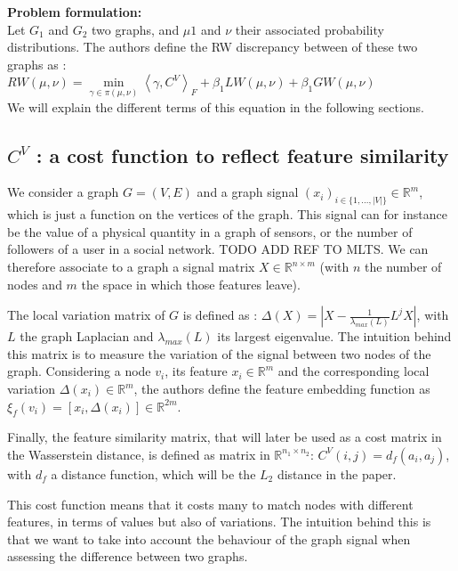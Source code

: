 \documentclass[a4paper,11pt]{article}
\begin{document}
\textbf{Problem formulation:} \\
Let $G_1$ and $G_2$ two graphs, and $\mu1$ and $\nu$ their associated probability distributions.
The authors define the RW discrepancy between of these two graphs as : \\

$RW(\mu, \nu) = \underset{\gamma \in \pi(\mu, \nu)}{\operatorname{min}} {\left\langle \gamma , C^V \right\rangle}_F   + \beta_1 LW(\mu, \nu)  +\beta_1 GW(\mu, \nu) $\\

We will explain the different terms of this equation in the following sections.

\subsection{$C^V$ : a cost function to reflect feature similarity}
\label{CV}
We consider a graph $G=(V, E)$ and a graph signal $(x_i)_{i \in \{1, ..., |V| \} } \in \mathbb{R}^m$, which is just a function on the vertices of the graph. 
This signal can for instance be the value of a physical quantity in a graph of sensors, or the number of followers of a user in a social network.
TODO ADD REF TO MLTS. 
We can therefore associate to a graph a signal matrix $X \in \mathbb{R}^{n \times m}$ (with $n$ the number of nodes and $m$ the space in which those features leave).

The local variation matrix of $G$ is defined as : $\Delta(X) = | X - \frac{1}{\lambda_{max}(L)} L^j X  |$, with $L$ the graph Laplacian and $\lambda_{max}(L)$ its largest eigenvalue.
The intuition behind this matrix is to measure the variation of the signal between two nodes of the graph.
Considering a node $v_i$, its feature $x_i \in \mathbb{R}^m$ and the corresponding local variation $\Delta(x_i) \in \mathbb{R}^m$, the authors define the feature embedding function as $\xi_f(v_i) = [x_i, \Delta(x_i)] \in \mathbb{R}^{2m}$.

Finally, the feature similarity matrix, that will later be used as a cost matrix in the Wasserstein distance, is defined as  matrix in $\mathbb{R}^{n_1 \times n_2}$: $C^V(i,j) = d_f(a_i, a_j) $, with $d_f$ a distance function, which will be the $L_2$ distance in the paper.

This cost function means that it costs many to match nodes with different features, in terms of values but also of variations. 
The intuition behind this is that we want to take into account the behaviour of the graph signal when assessing the difference between two graphs.
\end{document}
